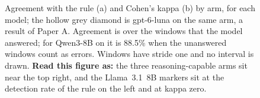 \begin{figure}[!t]
\centering
\resultfigure{\figAgree}
\caption{Agreement with the rule (a) and Cohen's kappa (b) by arm, for each model; the hollow grey diamond is gpt-6-luna on the same arm, a result of Paper A. Agreement is over the windows that the model answered; for Qwen3-8B on  it is 88.5\% when the unanswered windows count as errors. Windows have stride one and no interval is drawn. \textbf{Read this figure as:} the three reasoning-capable arms sit near the top right, and the Llama~3.1~8B markers sit at the detection rate of the rule on the left and at kappa zero.}
\label{fig:agree}
\end{figure}
